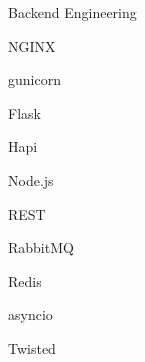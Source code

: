 \begin{skillset}{Backend Engineering}
  \item NGINX
  \item gunicorn
  \item Flask
  \item Hapi
  \item Node.js
  \item REST
  \item RabbitMQ
  \item Redis
  \item asyncio
  \item Twisted
\end{skillset}
